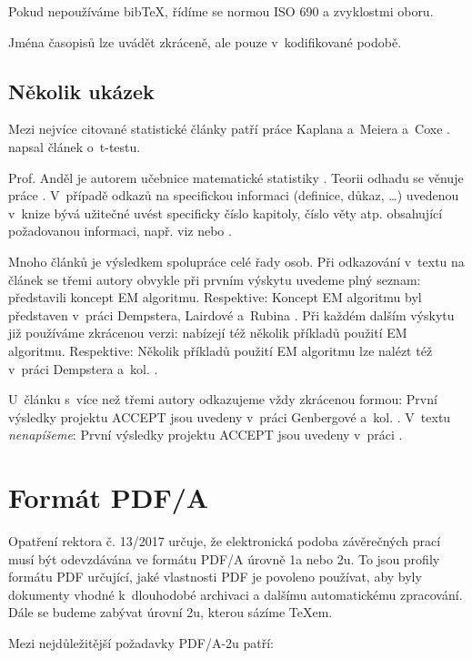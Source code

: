 Pokud nepoužíváme bib\TeX{}, řídíme se normou ISO 690 a zvyklostmi
oboru.

Jména časopisů lze uvádět zkráceně, ale pouze v~kodifikované podobě.

\section{Několik ukázek}

Mezi nejvíce citované statistické články patří práce Kaplana a~Meiera a~Coxe
\citep{KaplanMeier58, Cox72}. \citet{Student08} napsal článek o~t-testu.

Prof. Anděl je autorem učebnice matematické statistiky
\citep[viz][]{Andel98}. Teorii odhadu se věnuje práce
\citet{LehmannCasella98}. V~případě odkazů na specifickou informaci
(definice, důkaz, \dots) uvedenou v~knize bývá užitečné uvést
specificky číslo kapitoly, číslo věty atp. obsahující požadovanou
informaci, např. viz \citet[Věta 4.22]{Andel07} nebo \citep[viz][Věta
      4.22]{Andel07}.

Mnoho článků je výsledkem spolupráce celé řady osob. Při odkazování
v~textu na článek se třemi autory obvykle při prvním výskytu uvedeme
plný seznam: \citet*{DempsterLairdRubin77} představili koncept EM
algoritmu. Respektive: Koncept EM algoritmu byl představen v~práci
Dempstera, Lairdové a~Rubina \citep*{DempsterLairdRubin77}. Při každém
dalším výskytu již používáme zkrácenou verzi:
\citet{DempsterLairdRubin77} nabízejí též několik příkladů použití EM
algoritmu. Respektive: Několik příkladů použití EM algoritmu lze
nalézt též v~práci Dempstera a~kol. \citep{DempsterLairdRubin77}.

U~článku s~více než třemi autory odkazujeme vždy zkrácenou formou:
První výsledky projektu ACCEPT jsou uvedeny v~práci Genbergové a~kol.
\citep{Genberget08}. V~textu \emph{nenapíšeme}: První výsledky
projektu ACCEPT jsou uvedeny v~práci \citet*{Genberget08}.
\chapter{Formát PDF/A}

Opatření rektora č. 13/2017 určuje, že elektronická podoba závěrečných
prací musí být odevzdávána ve formátu PDF/A úrovně 1a nebo 2u. To jsou
profily formátu PDF určující, jaké vlastnosti PDF je povoleno používat,
aby byly dokumenty vhodné k~dlouhodobé archivaci a dalšímu automatickému
zpracování. Dále se budeme zabývat úrovní 2u, kterou sázíme \TeX{}em.

Mezi nejdůležitější požadavky PDF/A-2u patří:

